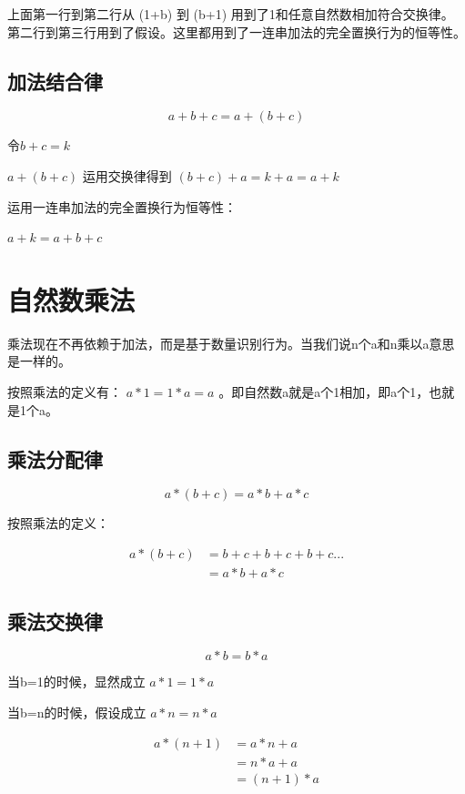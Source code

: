 \documentclass[12pt,oneside]{book}
\begin{document}
上面第一行到第二行从 (1+b) 到 (b+1) 用到了1和任意自然数相加符合交换律。第二行到第三行用到了假设。这里都用到了一连串加法的完全置换行为的恒等性。

\subsection{加法结合律}
\begin{equation}
a + b + c = a + (b + c)
\end{equation}

令$b+c=k$

$a+ (b + c)$ 运用交换律得到 $(b+c) +a = k+a = a+k$

运用一连串加法的完全置换行为恒等性：

$a+k = a+ b+c$

\section{自然数乘法}
乘法现在不再依赖于加法，而是基于数量识别行为。当我们说n个a和n乘以a意思是一样的。

按照乘法的定义有： $a * 1 = 1*a = a$ 。即自然数a就是a个1相加，即a个1，也就是1个a。


\subsection{乘法分配律}
\begin{equation}
a*(b + c) = a*b + a*c
\end{equation}

按照乘法的定义：

\begin{align*}
a*(b+c) &= b+c + b+ c + b +c ...\\
&=a*b + a*c
\end{align*}


\subsection{乘法交换律}
\begin{equation}
a * b = b * a
\end{equation}

当b=1的时候，显然成立 $a*1 = 1*a$

当b=n的时候，假设成立 $a*n=n*a$

\begin{align*}
a*(n+1) &= a*n +a \\
&=n*a +a\\
&=(n+1)*a
\end{align*}
\end{document}
